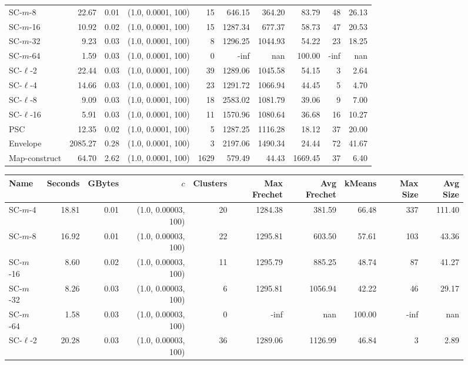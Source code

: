 \begin{figure}
\begin{center}
\begin{minipage}{\textwidth}
{\begin{tabular}{@{}lrrrrrrrrr@{}}
SC-$m$-8 & 22.67 & 0.01 & (1.0, 0.0001, 100) & 15 & 646.15 & 364.20 & 83.79 & 48 & 26.13\\
SC-$m$-16 & 10.92 & 0.02 & (1.0, 0.0001, 100) & 15 & 1287.34 & 677.37 & 58.73 & 47 & 20.53\\
SC-$m$-32 & 9.23 & 0.03 & (1.0, 0.0001, 100) & 8 & 1296.25 & 1044.93 & 54.22 & 23 & 18.25\\
SC-$m$-64 & 1.59 & 0.03 & (1.0, 0.0001, 100) & 0 & -inf & nan & 100.00 & -inf & nan\\
SC-$\ell$-2 & 22.44 & 0.03 & (1.0, 0.0001, 100) & 39 & 1289.06 & 1045.58 & 54.15 & 3 & 2.64\\
SC-$\ell$-4 & 14.66 & 0.03 & (1.0, 0.0001, 100) & 23 & 1291.72 & 1066.94 & 44.45 & 5 & 4.70\\
SC-$\ell$-8 & 9.09 & 0.03 & (1.0, 0.0001, 100) & 18 & 2583.02 & 1081.79 & 39.06 & 9 & 7.00\\
SC-$\ell$-16 & 5.91 & 0.03 & (1.0, 0.0001, 100) & 11 & 1570.96 & 1080.64 & 36.68 & 16 & 10.27\\
PSC & 12.35 & 0.02 & (1.0, 0.0001, 100) & 5 & 1287.25 & 1116.28 & 18.12 & 37 & 20.00\\
Envelope & 2085.27 & 0.28 & (1.0, 0.0001, 100) & 3 & 2197.06 & 1490.34 & 24.44 & 72 & 41.67\\
Map-construct & 64.70 & 2.62 & (1.0, 0.0001, 100) & 1629 & 579.49 & 44.43 & 1669.45 & 37 & 6.40\\
        \bottomrule
    \end{tabular}
    }
    {
    \begin{tabular}{@{}lrrrrrrrrr@{}}
        \toprule
        Name & Seconds & GBytes & $c$ & Clusters & Max Frechet & Avg Frechet & kMeans & Max Size & Avg Size\\
        \midrule
        SC-$m$-4 & 18.81 & 0.01 & (1.0, 0.00003, 100) & 20 & 1284.38 & 381.59 & 66.48 & 337 & 111.40\\
SC-$m$-8 & 16.92 & 0.01 & (1.0, 0.00003, 100) & 22 & 1295.81 & 603.50 & 57.61 & 103 & 43.36\\
SC-$m$-16 & 8.60 & 0.02 & (1.0, 0.00003, 100) & 11 & 1295.79 & 885.25 & 48.74 & 87 & 41.27\\
SC-$m$-32 & 8.26 & 0.03 & (1.0, 0.00003, 100) & 6 & 1295.81 & 1056.94 & 42.22 & 46 & 29.17\\
SC-$m$-64 & 1.58 & 0.03 & (1.0, 0.00003, 100) & 0 & -inf & nan & 100.00 & -inf & nan\\
SC-$\ell$-2 & 20.28 & 0.03 & (1.0, 0.00003, 100) & 36 & 1289.06 & 1126.99 & 46.84 & 3 & 2.89\\

\end{tabular}}
\end{minipage}
\end{center}
\end{figure}
